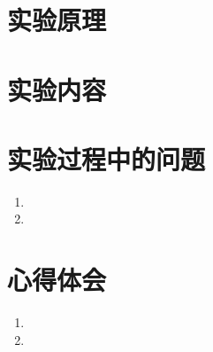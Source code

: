 \documentclass[12pt]{ctexart}
\begin{document}

\section{实验原理}


\section{实验内容}


\section{实验过程中的问题}

\begin{enumerate}
    \item
    \item
\end{enumerate}

\section{心得体会}

\begin{enumerate}
    \item
    \item
\end{enumerate}
\end{document}

